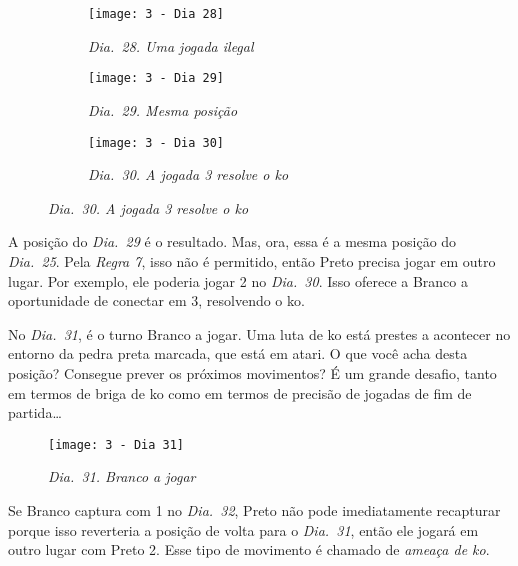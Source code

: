 \begin{figure}[h]
  \centering
  \begin{subfigure}[t]{.3\textwidth}
      \centering
      \texttt{[image: 3 - Dia 28]}
      \caption*{\emph{Dia.\@~28. Uma jogada ilegal}}
  \end{subfigure}
  \hfill
  \begin{subfigure}[t]{.3\textwidth}
      \centering
      \texttt{[image: 3 - Dia 29]}
      \caption*{\emph{Dia.\@~29. Mesma posição}}
  \end{subfigure}
  \hfill
  \begin{subfigure}[t]{.3\textwidth}
      \centering
      \texttt{[image: 3 - Dia 30]}
      \caption*{\emph{Dia.\@~30. A jogada 3 resolve o ko}}
  \end{subfigure}
\end{figure}

A posição do \emph{Dia.\@~29} é o resultado. Mas, ora, essa é a mesma posição do \emph{Dia.\@~25}. Pela \emph{Regra 7}, isso não é permitido, então Preto precisa jogar em outro lugar. Por exemplo, ele poderia jogar 2 no \emph{Dia.\@~30}. Isso oferece a Branco a oportunidade de conectar em 3, resolvendo o ko.

No \emph{Dia.\@~31}, é o turno Branco a jogar. Uma luta de ko está prestes a acontecer no entorno da pedra preta marcada, que está em atari. O que você acha desta posição? Consegue prever os próximos movimentos? É um grande desafio, tanto em termos de briga de ko como em termos de precisão de jogadas de fim de partida\ldots

\begin{figure}[h]
    \centering
    \captionsetup{justification=centering}
    \texttt{[image: 3 - Dia 31]}
    \caption*{\emph{Dia.\@~31. Branco a jogar}}
\end{figure}

\pagebreak

Se Branco captura com 1 no \emph{Dia.\@~32}, Preto não pode imediatamente recapturar porque isso reverteria a posição de volta para o \emph{Dia.\@~31}, então ele jogará em outro lugar com Preto 2. Esse tipo de movimento é chamado de \emph{ameaça de ko}.

